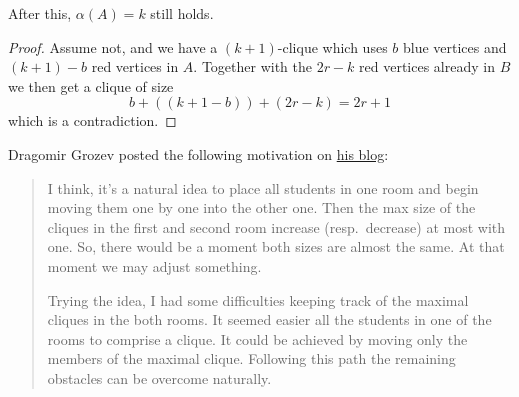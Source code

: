 \begin{claim*}
  After this, $\alpha(A) = k$ still holds.
\end{claim*}
\begin{proof}
  Assume not, and we have a $(k+1)$-clique
  which uses $b$ blue vertices and $(k+1)-b$ red vertices in $A$.
  Together with the $2r-k$ red vertices already in $B$
  we then get a clique of size
  \[ b + \left( (k+1-b) \right)
  + \left( 2r-k \right) = 2r + 1 \]
  which is a contradiction.
\end{proof}

\begin{remark*}
  Dragomir Grozev posted the
  following motivation on
  \href{https://dgrozev.wordpress.com/2019/12/05/splitting-the-cliques-of-a-graph-imo-2007-p3/}{his blog}:
  \begin{quote}
  I think, it’s a natural idea to
  place all students in one room and begin
  moving them one by one into the other one.
  Then the max size of the cliques in the first and second room
  increase (resp.\ decrease) at most with one.
  So, there would be a moment both sizes are almost the same.
  At that moment we may adjust something.

  Trying the idea, I had some difficulties
  keeping track of the maximal cliques in the both rooms.
  It seemed easier all the students in one of the rooms
  to comprise a clique.
  It could be achieved by moving only the members
  of the maximal clique.
  Following this path the remaining obstacles
  can be overcome naturally.
  \end{quote}
\end{remark*}
